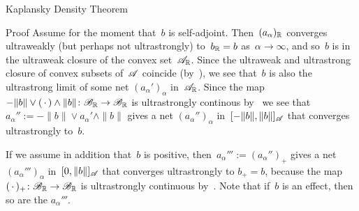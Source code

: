 \documentclass[a]{subfiles}
\begin{document}
\begin{parsec}
\begin{point}[kaplansky]{Kaplansky Density Theorem}
\begin{point}{Proof}
Assume for the moment that~$b$ is self-adjoint.
Then~$(a_\alpha)_{\mathbb{R}}$
converges ultraweakly (but perhaps not ultrastrongly)
to~$b_{\mathbb{R}}=b$
as~$\alpha\to\infty$,
and so~$b$ is in the ultraweak
closure of the convex set~$\mathscr{A}_{\mathbb{R}}$.
Since the ultraweak and ultrastrong closure
of convex subsets of~$\mathscr{A}$
coincide (by~),
we see that~$b$ is also the ultrastrong limit
of some net $(a_\alpha')_\alpha$ in~$\mathscr{A}_{\mathbb{R}}$.
Since the map~$-\|b\|\vee(\,\cdot\,)\wedge \|b\|\colon
\mathscr{B}_{\mathbb{R}}\to\mathscr{B}_{\mathbb{R}}$
is ultrastrongly continous by~
we see that 
$a_\alpha'' := -\|b\|\vee a_\alpha'\wedge \|b\|$
gives a net $(a_\alpha'')_\alpha$
in~$[-\|b\|,\|b\|]_{\mathscr{A}}$
that
converges ultrastrongly
to~$b$.

If we assume in addition
that~$b$ is positive,
then~$a_\alpha''' := (a_\alpha'')_+$
gives a net~$(a_\alpha''')_\alpha$
in~$[0,\|b\|]_{\mathscr{A}}$
that converges ultrastrongly to $b_+=b$,
because the map $(\,\cdot\,)_+\colon \mathscr{B}_{\mathbb{R}}\to\mathscr{B}_{\mathbb{R}}$
is ultrastrongly continuous by~.
Note that if~$b$ is an effect,
then so are the $a_\alpha'''$.


\end{point}
\end{point}
\end{parsec}
\end{document}
